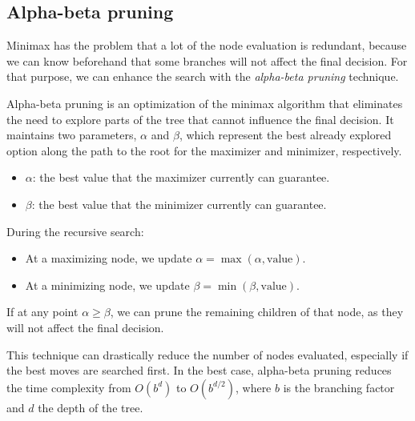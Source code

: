 \subsection*{Alpha-beta pruning}\label{sec:alphaBeta}

Minimax has the problem that a lot of the node evaluation is redundant, because we can know beforehand that some branches will not affect the final decision. For that purpose, we can enhance the search with the \textit{alpha-beta pruning} technique. 

\vspace{1em}

\noindent Alpha-beta pruning is an optimization of the minimax algorithm that eliminates the need to explore parts of the tree that cannot influence the final decision. It maintains two parameters, \(\alpha\) and \(\beta\), which represent the best already explored option along the path to the root for the maximizer and minimizer, respectively.

\begin{itemize}
    \item \(\alpha\): the best value that the maximizer currently can guarantee.
    \item \(\beta\): the best value that the minimizer currently can guarantee.
\end{itemize}

During the recursive search:
\begin{itemize}
    \item At a maximizing node, we update \(\alpha = \operatorname{max}(\alpha, \text{value})\).
    \item At a minimizing node, we update \(\beta = \operatorname{min}(\beta, \text{value})\).
\end{itemize}

If at any point \(\alpha \geq \beta\), we can prune the remaining children of that node, as they will not affect the final decision.

\vspace{1em}

This technique can drastically reduce the number of nodes evaluated, especially if the best moves are searched first. In the best case, alpha-beta pruning reduces the time complexity from \(O(b^d)\) to \(O(b^{d/2})\), where \(b\) is the branching factor and \(d\) the depth of the tree.

\vspace{1em}

